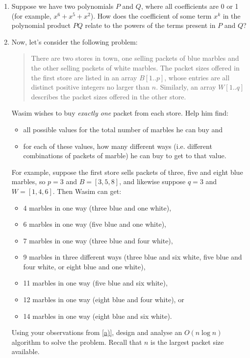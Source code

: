 \documentclass[12pt]{article}
\begin{document}

\begin{question}
\begin{enumerate}
    \item \label{a)}Suppose we have two polynomials $P$ and $Q$, where all coefficients are 0 or 1 (for example, $x^6 + x^5 + x^2$). How does the coefficient of some term $x^k$ in the polynomial product $PQ$ relate to the powers of the terms present in $P$ and $Q$?
    \item Now, let's consider the following problem: 

    \begin{quote}
    There are two stores in town, one selling packets of blue marbles and the other selling packets of white marbles. The packet sizes offered in the first store are listed in an array $B[1..p]$, whose entries are all distinct positive integers no larger than $n$. Similarly, an array $W[1..q]$ describes the packet sizes offered in the other store.
    \end{quote}
    
    Wasim wishes to buy \emph{exactly one} packet from each store. Help him find: 
    \begin{itemize}
        \item all possible values for the total number of marbles he can buy and 
        \item for each of these values, how many different ways (i.e. different combinations of packets of marble) he can buy to get to that value.
    \end{itemize}

    For example, suppose the first store sells packets of three, five and eight blue marbles, so $p = 3$ and $B = [3,5,8]$, and likewise suppose $q = 3$ and $W = [1,4,6]$.
    Then Wasim can get:
    \begin{itemize}
        \item 4 marbles in one way (three blue and one white),
        \item 6 marbles in one way (five blue and one white),
        \item 7 marbles in one way (three blue and four white),
        \item 9 marbles in three different ways (three blue and six white, five blue and four white, or eight blue and one white),
        \item 11 marbles in one way (five blue and six white),
        \item 12 marbles in one way (eight blue and four white), or
        \item 14 marbles in one way (eight blue and six white).
    \end{itemize}

    Using your observations from \ref{a)}, design and analyse an $O(n \log n)$ algorithm to solve the problem. Recall that $n$ is the largest packet size available.
\end{enumerate}
\end{question}
\end{document}
